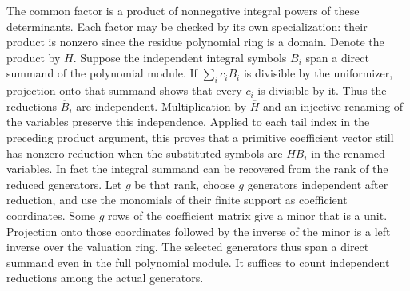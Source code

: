 \documentclass[11pt]{amsart}
\theoremstyle{definition}
\theoremstyle{remark}
\begin{document}
The common factor is a product of nonnegative integral powers of
these determinants. Each factor may be checked by its own
specialization: their product is nonzero since the residue
polynomial ring is a domain. Denote the product by $H$. Suppose
the independent integral symbols $B_i$ span a direct summand of
the polynomial module. If $\sum_i c_i B_i$ is divisible by the
uniformizer, projection onto that summand shows that every $c_i$
is divisible by it. Thus the reductions $\overline B_i$ are
independent. Multiplication by $\overline H$ and an injective
renaming of the variables preserve this independence. Applied to
each tail index in the preceding product argument, this proves
that a primitive coefficient vector still has nonzero reduction
when the substituted symbols are $H B_i$ in the renamed variables.
In fact the integral summand can be recovered from the rank of the
reduced generators. Let $g$ be that rank, choose $g$ generators
independent after reduction, and use the monomials of their finite
support as coefficient coordinates. Some $g$ rows of the coefficient
matrix give a minor that is a unit. Projection onto those coordinates
followed by the inverse of the minor is a left inverse over the
valuation ring. The selected generators thus span a direct summand
even in the full polynomial module. It suffices to count independent
reductions among the actual generators.
\end{document}
